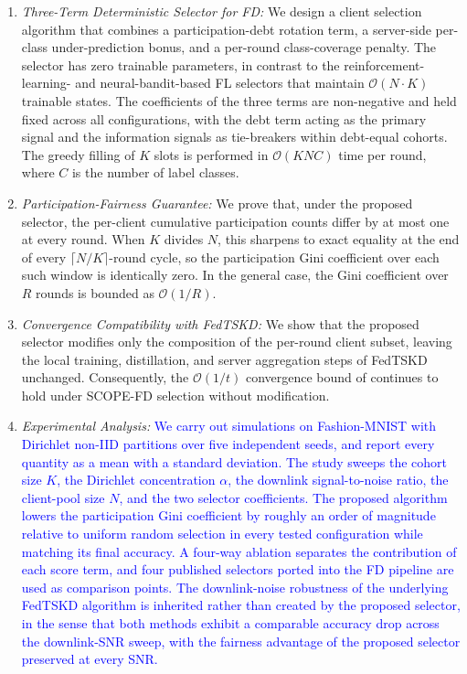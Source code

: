 \documentclass[journal]{IEEEtran}
\newcommand{\rev}[1]{\textcolor{blue}{#1}}
\begin{document}
\begin{enumerate}
    \item \textit{Three-Term Deterministic Selector for FD:} We design a client selection algorithm that combines a participation-debt rotation term, a server-side per-class under-prediction bonus, and a per-round class-coverage penalty. The selector has zero trainable parameters, in contrast to the reinforcement-learning- and neural-bandit-based FL selectors that maintain $\mathcal{O}(N\cdot K)$ trainable states. The coefficients of the three terms are non-negative and held fixed across all configurations, with the debt term acting as the primary signal and the information signals as tie-breakers within debt-equal cohorts. The greedy filling of $K$ slots is performed in $\mathcal{O}(KNC)$ time per round, where $C$ is the number of label classes.

    \item \textit{Participation-Fairness Guarantee:} We prove that, under the proposed selector, the per-client cumulative participation counts differ by at most one at every round. When $K$ divides $N$, this sharpens to exact equality at the end of every $\lceil N/K \rceil$-round cycle, so the participation Gini coefficient over each such window is identically zero. In the general case, the Gini coefficient over $R$ rounds is bounded as $\mathcal{O}(1/R)$.

    \item \textit{Convergence Compatibility with FedTSKD:} We show that the proposed selector modifies only the composition of the per-round client subset, leaving the local training, distillation, and server aggregation steps of FedTSKD \cite{mu2024fedtskd} unchanged. Consequently, the $\mathcal{O}(1/t)$ convergence bound of \cite{mu2024fedtskd} continues to hold under SCOPE-FD selection without modification.

    \item \textit{Experimental Analysis:} \rev{We carry out simulations on Fashion-MNIST with Dirichlet non-IID partitions over five independent seeds, and report every quantity as a mean with a standard deviation. The study sweeps the cohort size $K$, the Dirichlet concentration $\alpha$, the downlink signal-to-noise ratio, the client-pool size $N$, and the two selector coefficients. The proposed algorithm lowers the participation Gini coefficient by roughly an order of magnitude relative to uniform random selection in every tested configuration while matching its final accuracy. A four-way ablation separates the contribution of each score term, and four published selectors ported into the FD pipeline are used as comparison points. The downlink-noise robustness of the underlying FedTSKD algorithm is inherited rather than created by the proposed selector, in the sense that both methods exhibit a comparable accuracy drop across the downlink-SNR sweep, with the fairness advantage of the proposed selector preserved at every SNR.}
\end{enumerate}
\end{document}
